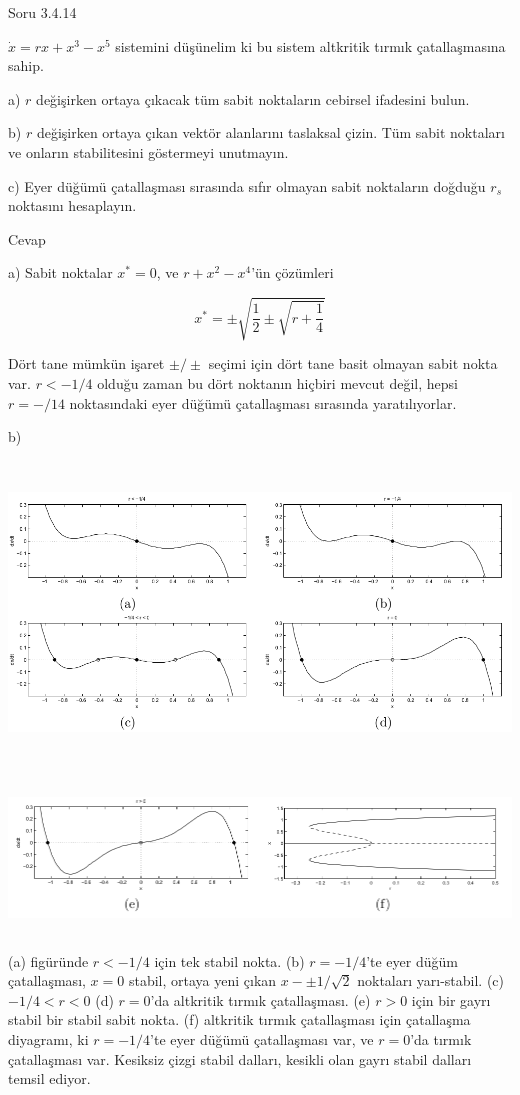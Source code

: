 \documentclass[12pt,fleqn]{article}\usepackage{../../common}
\begin{document}
Soru 3.4.14

$\dot{x} = rx + x^3 - x^5$ sistemini düşünelim ki bu sistem altkritik tırmık
çatallaşmasına sahip.

a) $r$ değişirken ortaya çıkacak tüm sabit noktaların cebirsel ifadesini bulun.

b) $r$ değişirken ortaya çıkan vektör alanlarını taslaksal çizin. Tüm sabit
noktaları ve onların stabilitesini göstermeyi unutmayın.

c) Eyer düğümü çatallaşması sırasında sıfır olmayan sabit noktaların doğduğu
$r_s$ noktasını hesaplayın.

Cevap

a) Sabit noktalar $x^\ast=0$, ve  $r + x^2 - x^4$'ün çözümleri

$$ x^\ast = \pm \sqrt{ \frac{1}{2} \pm \sqrt{r + \frac{1}{4}} }  $$

Dört tane mümkün işaret $\pm/\pm$ seçimi için dört tane basit olmayan sabit
nokta var. $r<-1/4$ olduğu zaman bu dört noktanın hiçbiri mevcut değil, hepsi
$r=-/14$ noktasındaki eyer düğümü çatallaşması sırasında yaratılıyorlar. 

b)

\includegraphics[height=8cm]{08_06.png}

\includegraphics[height=4cm]{08_07.png}

(a) figüründe $r<-1/4$ için tek stabil nokta. (b) $r=-1/4$'te eyer düğüm
çatallaşması, $x=0$ stabil, ortaya yeni çıkan $x - \pm 1/\sqrt{2}$ noktaları
yarı-stabil. (c) $-1/4 < r < 0$ (d) $r=0$'da altkritik tırmık çatallaşması. (e)
$r>0$ için bir gayrı stabil bir stabil sabit nokta. (f) altkritik tırmık
çatallaşması için çatallaşma diyagramı, ki $r=-1/4$'te eyer düğümü çatallaşması
var, ve $r=0$'da tırmık çatallaşması var. Kesiksiz çizgi stabil dalları, kesikli
olan gayrı stabil dalları temsil ediyor. 
\end{document}
